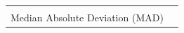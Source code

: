 \documentclass[
]{book}
\begin{document}
\begin{longtable}[]{@{}
  >{\raggedright\arraybackslash}p{}
  >{\raggedright\arraybackslash}p{}@{}}
                                                                                                                                                                                                                                                                                                                                                                                                                                                                                                                                                                                                                                                                                                                                                                                                                                                                                                                                                                                                                                                                                                                                                                                                                            \) \\
Median Absolute Deviation (MAD) & \(                                                                                                                                                                                                                                                                                                                                                                                                                                                                                                                                                                                                                                                                                                                                                                                                                                                                                                                                                                                                                                                                                                                                                                                        

\end{longtable}
\end{document}

